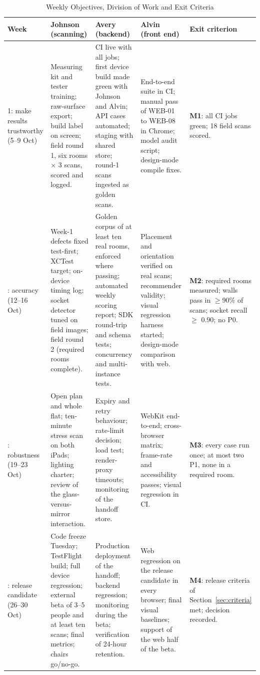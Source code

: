 \documentclass[conference,a4paper,10pt]{IEEEtran}
\begin{document}
\begin{table}[!t]
\caption{Weekly Objectives, Division of Work and Exit Criteria}
\label{tab:weeks}
\centering
\footnotesize
\begin{tabularx}{\textwidth}{@{}L{1.9cm}YYYL{3.3cm}@{}}
\toprule
Week & Johnson (scanning) & Avery (backend) & Alvin (front end) & Exit criterion \\
: make results trustworthy (5--9 Oct) &
Measuring kit and tester training; raw-surface export; build label on
screen; field round 1, six rooms $\times$ 3 scans, scored and logged. &
CI live with all jobs; first device build made green with Johnson and
Alvin; API cases automated; staging with shared store; round-1 scans
ingested as golden scans. &
End-to-end suite in CI; manual pass of WEB-01 to WEB-08 in Chrome; model
audit script; design-mode compile fixes. &
\textbf{M1}: all CI jobs green; 18 field scans scored. \\
: accuracy (12--16 Oct) &
Week-1 defects fixed test-first; XCTest target; on-device timing log;
socket detector tuned on field images; field round 2 (required rooms
complete). &
Golden corpus of at least ten real rooms, enforced where passing; automated
weekly scoring report; SDK round-trip and schema tests; concurrency and
multi-instance tests. &
Placement and orientation verified on real scans; recommender validity;
visual regression harness started; design-mode comparison with web. &
\textbf{M2}: required rooms measured; walls pass in $\ge$90\% of scans;
socket recall $\ge$ 0.90; no P0. \\
: robustness (19--23 Oct) &
Open plan and whole flat; ten-minute stress scan on both iPads; lighting
charter; review of the glass-versus-mirror interaction. &
Expiry and retry behaviour; rate-limit decision; load test; render-proxy
timeouts; monitoring of the handoff store. &
WebKit end-to-end; cross-browser matrix; frame-rate and accessibility
passes; visual regression in CI. &
\textbf{M3}: every case run once; at most two P1, none in a required room. \\
: release candidate (26--30 Oct) &
Code freeze Tuesday; TestFlight build; full device regression; external
beta of 3--5 people and at least ten scans; final metrics; chairs go/no-go. &
Production deployment of the handoff; backend regression; monitoring
during the beta; verification of 24-hour retention. &
Web regression on the release candidate in every browser; final visual
baselines; support of the web half of the beta. &
\textbf{M4}: release criteria of Section~\ref{sec:criteria} met;
decision recorded. \\
\bottomrule
\end{tabularx}
\end{table}
\end{document}
